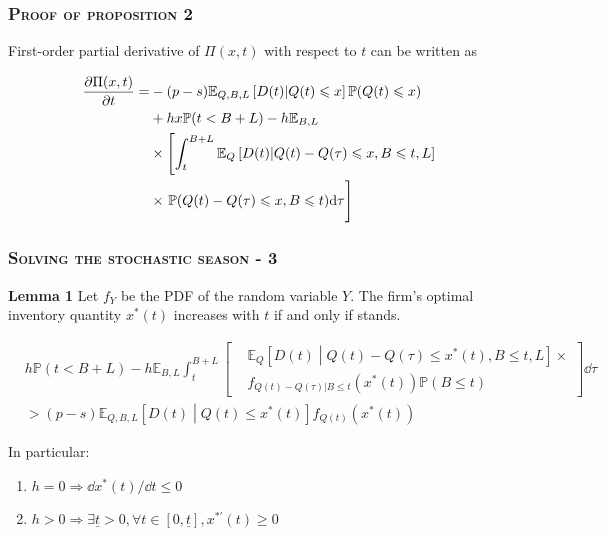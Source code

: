 \documentclass[aspectratio=169]{../presentation}
\begin{document}
    \begin{frame}
        \frametitle{\textsc{Proof of proposition 2}}

        First-order partial derivative of $\Pi(x, t)$ with respect to $t$ can be written as

        \begin{equation}
            \begin{aligned}
                \frac{\partial \Pi(x, t)}{\partial t} =& -(p-s)\mathbb E_{Q, B, L}\left[D(t) | Q(t)\leq x\right]\mathbb P(Q(t)\leq x) \\
                &+ hx\mathbb P(t < B + L) - h\mathbb E_{B, L} \\
                &\times \left[\int_t^{B+L} \mathbb E_Q\left[D(t) | Q(t) - Q(\tau)\leq x, B\leq t, L\right]\right. \\
                &\times\left.\vphantom{\int_t^{B+L}}\mathbb P(Q(t) - Q(\tau)\leq x, B\leq t)\dd \tau\right]
            \end{aligned}
        \end{equation}

    \end{frame}

    \begin{frame}
        \frametitle{\textsc{Solving the stochastic season - 3}}

        \textrm{\bfseries Lemma 1} Let $f_Y$ be the PDF of the random variable $Y$. The firm's optimal inventory quantity $x^*(t)$ increases with $t$ if and only if  stands.

        \begin{equation}
            \begin{aligned}
                & h\mathbb P(t < B+L) - h\mathbb E_{B, L}\int_t^{B+L}\left[\begin{aligned}
                    & \mathbb E_Q\left[D(t)\middle|Q(t) - Q(\tau) \leq x^*(t), B\leq t, L\right] \times \\
                    & f_{Q(t)-Q(\tau)|B\leq t}\left(x^*(t)\right)\mathbb P(B\leq t)
                \end{aligned}\right]\dd \tau \\
                &> (p-s)\mathbb{E}_{Q, B, L}\left[D(t)\middle| Q(t)\leq x^*(t)\right]f_{Q(t)}\left(x^*(t)\right)
            \end{aligned}
            \label{eq:4}
        \end{equation}

        \pause

        In particular:

        \begin{enumerate}
            \item $h = 0\Rightarrow \dd x^*(t) / \dd t \leq 0$
            \item $h > 0\Rightarrow \exists \underline{t} > 0, \forall t\in [0, \underline t], x^{*\prime}(t) \geq 0$
        \end{enumerate}
    \end{frame}
\end{document}
